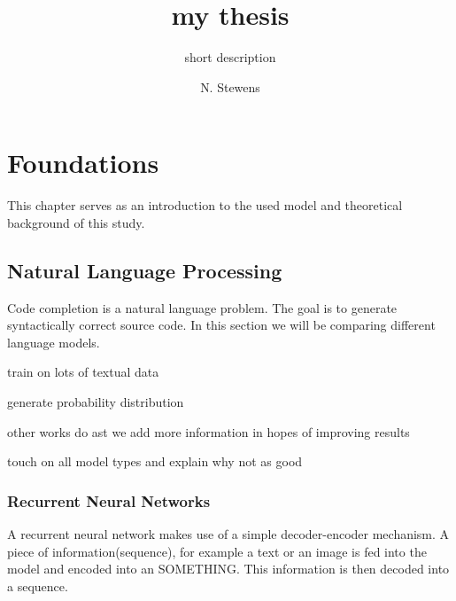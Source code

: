 \documentclass[
	english,
	ruledheaders=section,
	class=report,
	thesis={type=bachelor},
	accentcolor=9c,
	custommargins=true,
	marginpar=false,
	parskip=half-,
	fontsize=11pt,
]{tudapub}
\begin{document}

\title{my thesis}
\subtitle{short description}
\author[N. Stewens]{N. Stewens}


\submissiondate{\today}
\examdate{\today}


\maketitle
\affidavit

\tableofcontents

% 



 





\chapter{Foundations}
This chapter serves as an introduction to the used model and theoretical background of this study. 

\section{Natural Language Processing}
Code completion is a natural language problem. The goal is to generate syntactically correct source code. In this section we will be comparing different language models.

train on lots of textual data

generate probability distribution

other works do ast we add more information in hopes of improving results

touch on all model types and explain why not as good

\subsection{Recurrent Neural Networks}
A recurrent neural network makes use of a simple decoder-encoder mechanism. A piece of information(sequence), for example a text or an image is fed into the model and encoded into an SOMETHING. This information is then decoded into a sequence. 
\end{document}
